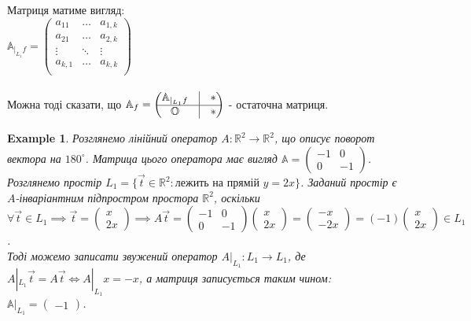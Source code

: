 \documentclass[a4paper, 10pt]{article}
\theoremstyle{theoremdd}
\theoremstyle{theoremdd}
\theoremstyle{theoremdd}
\theoremstyle{theoremdd}
\newtheorem{example}[theorem]{Example}
\theoremstyle{theoremdd}
\theoremstyle{theoremdd}
\theoremstyle{theoremdd}
\theoremstyle{theoremdd}
\begin{document}
Матриця матиме вигляд:\\
$\mathbb{A}_{|_{L_1}f} = \begin{pmatrix}
a_{11} & \dots & a_{1,k}\\
a_{21} & \dots & a_{2,k}\\
\vdots & \ddots & \vdots\\
a_{k,1} & \dots & a_{k,k}\\
\end{pmatrix}$\\
\\
Можна тоді сказати, що 
$\mathbb{A}_f = \begin{pmatrix}
 \mathbb{A}_{|_{L_1}f}  & \vline & * \\
 \hline
 \mathbb{O} & \vline & *
\end{pmatrix}$ - остаточна матриця.


\begin{example}
Розглянемо лінійний оператор $A: \mathbb{R}^2 \to \mathbb{R}^2$, що описує поворот вектора на $180^\circ$. Матрица цього оператора має вигляд $\mathbb{A} = \begin{pmatrix}
-1 & 0 \\
0 & -1
\end{pmatrix}$.\\
Розглянемо простір $L_1 = \{ \vec{t} \in \mathbb{R}^2 : \text{лежить на прямій } y = 2x \}$. Заданий простір є $A$-інваріантним підпростром простора $\mathbb{R}^2$, оскільки\\
$\forall \vec{t} \in L_1 \implies \vec{t} = \begin{pmatrix}
x \\ 2x
\end{pmatrix} \implies A \vec{t} = \begin{pmatrix}
-1 & 0 \\
0 & -1
\end{pmatrix} \begin{pmatrix}
x \\ 2x
\end{pmatrix} = \begin{pmatrix}
-x \\ -2x
\end{pmatrix} = (-1) \begin{pmatrix}
x \\ 2x
\end{pmatrix} \in L_1$.\\
Тоді можемо записати звужений оператор $A|_{L_1}: L_1 \to L_1$, де $A|_{L_1} \vec{t} = A \vec{t} \iff A|_{L_1} x = -x$, а матриця записується таким чином:\\
$\mathbb{A}|_{L_1} = \begin{pmatrix}
-1
\end{pmatrix}$.\\
\end{example}
\end{document}
